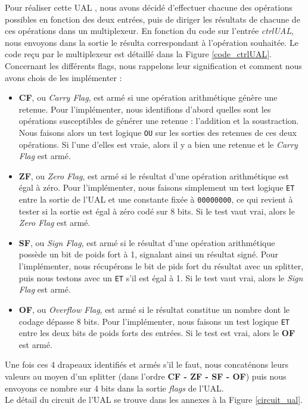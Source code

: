 \documentclass[10pt,a4paper]{article}
\begin{document}
Pour réaliser cette UAL , nous avons décidé d'effectuer chacune des opérations possibles en fonction des deux entrées, puis de diriger les résultats de chacune de ces opérations dans un multiplexeur. En fonction du code sur l'entrée \textit{ctrlUAL}, nous envoyons dans la sortie le résulta correspondant à l'opération souhaitée. Le code reçu par le multiplexeur est détaillé dans la Figure \ref{code_ctrlUAL}. 
Concernant les différents flags, nous rappelons leur signification et comment nous avons chois de les implémenter :
\begin{itemize}
\item \textbf{CF}, ou \textit{Carry Flag}, est armé si une opération arithmétique génère une retenue. Pour l'implémenter, nous identifions d'abord quelles sont les opérations susceptibles de générer une retenue : l'addition et la soustraction. Nous faisons alors un test logique \verb|OU| sur les sorties des retenues de ces deux opérations. Si l'une d'elles est vraie, alors il y a bien une retenue et le \textit{Carry Flag} est armé.
\item \textbf{ZF}, ou \textit{Zero Flag}, est armé si le résultat d'une opération arithmétique est égal à zéro. Pour l'implémenter, nous faisons simplement un test logique \verb|ET| entre la sortie de l'UAL et une constante fixée à \verb|00000000|, ce qui revient à tester si la sortie est égal à zéro codé sur 8 bits. Si le test vaut vrai, alors le \textit{Zero Flag} est armé.
\item \textbf{SF}, ou \textit{Sign Flag}, est armé si le résultat d'une opération arithmétique possède un bit de poids fort à 1, signalant ainsi un résultat signé. Pour l'implémenter, nous récupérons le bit de pids fort du résultat avec un splitter, puis nous testons avec un \verb|ET| s'il est égal à 1. Si le test vaut vrai, alors le \textit{Sign Flag} est armé.
\item \textbf{OF}, ou \textit{Overflow Flag}, est armé si le résultat constitue un nombre dont le codage dépasse 8 bits. Pour l'implémenter, nous faisons un test logique \verb|ET| entre les deux bits de poids forts des entrées. Si le test est vrai, alors le \textbf{OF} est armé.
\end{itemize} 

Une fois ces 4 drapeaux identifiés et armés s'il le faut, nous concaténons leurs valeurs au moyen d'un splitter (dans l'ordre \textbf{CF - ZF - SF - OF}) puis nous envoyons ce nombre sur 4 bits dans la sortie \textit{flags} de l'UAL. \\
Le détail du circuit de l'UAL se trouve dans les annexes à la Figure \ref{circuit_ual}.
\end{document}

